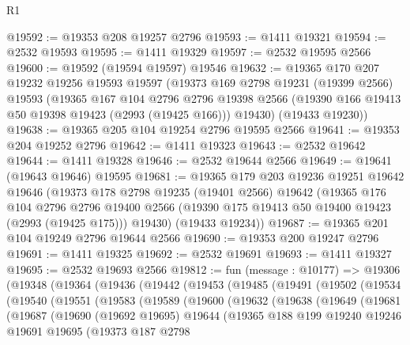 \begin{lexlean}{R1}
\begin{coremodule}
@19592 := @19353 @208 @19257 @2796
@19593 := @1411 @19321
@19594 := @2532 @19593
@19595 := @1411 @19329
@19597 := @2532 @19595 @2566
@19600 := @19592 (@19594 @19597) @19546
@19632 := @19365
    @170
    @207
    @19232
    @19256
    @19593
    @19597
    (@19373
      @169
      @2798
      @19231
      (@19399 @2566)
      @19593
      (@19365
        @167
        @104
        @2796
        @2796
        @19398
        @2566
        (@19390 @166 @19413 @50 @19398 @19423 (@2993 (@19425 @166)))
        @19430)
      (@19433 @19230))
@19638 := @19365 @205 @104 @19254 @2796 @19595 @2566
@19641 := @19353 @204 @19252 @2796
@19642 := @1411 @19323
@19643 := @2532 @19642
@19644 := @1411 @19328
@19646 := @2532 @19644 @2566
@19649 := @19641 (@19643 @19646) @19595
@19681 := @19365
    @179
    @203
    @19236
    @19251
    @19642
    @19646
    (@19373
      @178
      @2798
      @19235
      (@19401 @2566)
      @19642
      (@19365
        @176
        @104
        @2796
        @2796
        @19400
        @2566
        (@19390 @175 @19413 @50 @19400 @19423 (@2993 (@19425 @175)))
        @19430)
      (@19433 @19234))
@19687 := @19365 @201 @104 @19249 @2796 @19644 @2566
@19690 := @19353 @200 @19247 @2796
@19691 := @1411 @19325
@19692 := @2532 @19691
@19693 := @1411 @19327
@19695 := @2532 @19693 @2566
@19812 := fun (message : @10177) =>
  @19306
    (@19348
      (@19364
        (@19436
          (@19442
            (@19453
              (@19485
                (@19491
                  (@19502
                    (@19534
                      (@19540
                        (@19551
                          (@19583
                            (@19589
                              (@19600
                                (@19632
                                  (@19638
                                    (@19649
                                      (@19681
                                        (@19687
                                          (@19690
                                            (@19692 @19695)
                                            @19644
                                            (@19365
                                              @188
                                              @199
                                              @19240
                                              @19246
                                              @19691
                                              @19695
                                              (@19373
                                                @187
                                                @2798

\end{coremodule}
\end{lexlean}
